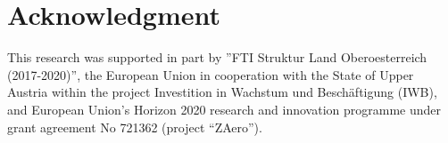 \documentclass[conference]{IEEEtran}
\begin{document}
\section*{Acknowledgment}
This research was supported in part by ”FTI Struktur Land Oberoesterreich (2017-2020)”, the European Union in cooperation with the State of Upper Austria within the project Investition in Wachstum und Beschäftigung (IWB), and European Union’s Horizon 2020 research and innovation programme under grant agreement No 721362 (project “ZAero”).

\small


\end{document}
